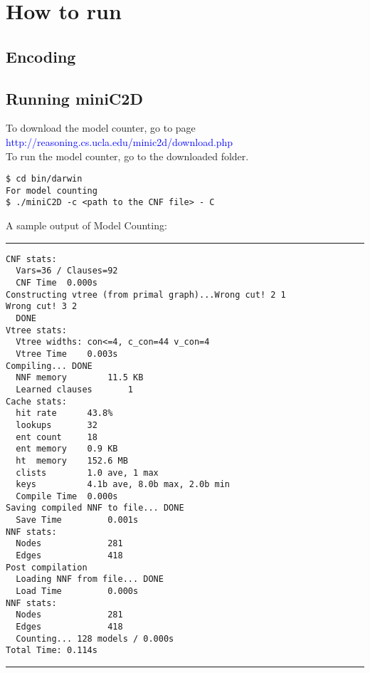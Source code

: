 \newpage
\appendix
\section*{How to run}
\subsection*{Encoding}

\subsection*{Running miniC2D}
To download the model counter, go to page \textcolor{blue}{http://reasoning.cs.ucla.edu/minic2d/download.php}\\
To run the model counter, go to the downloaded folder.
\begin{lstlisting}
$ cd bin/darwin
For model counting
$ ./miniC2D -c <path to the CNF file> - C
\end{lstlisting}
A sample output of Model Counting:\\
\noindent\rule{15cm}{0.4pt}
\begin{lstlisting}
CNF stats: 
  Vars=36 / Clauses=92
  CNF Time	0.000s
Constructing vtree (from primal graph)...Wrong cut! 2 1
Wrong cut! 3 2
  DONE
Vtree stats:
  Vtree widths: con<=4, c_con=44 v_con=4
  Vtree Time	0.003s
Compiling... DONE
  NNF memory      	11.5 KB
  Learned clauses      	1
Cache stats:
  hit rate   	43.8%
  lookups    	32
  ent count  	18
  ent memory 	0.9 KB
  ht  memory 	152.6 MB
  clists     	1.0 ave, 1 max
  keys       	4.1b ave, 8.0b max, 2.0b min
  Compile Time	0.000s
Saving compiled NNF to file... DONE
  Save Time       	0.001s
NNF stats:
  Nodes           	281
  Edges           	418
Post compilation
  Loading NNF from file... DONE
  Load Time       	0.000s
NNF stats:
  Nodes           	281
  Edges           	418
  Counting... 128 models / 0.000s
Total Time: 0.114s
\end{lstlisting}
\noindent\rule{15cm}{0.4pt}